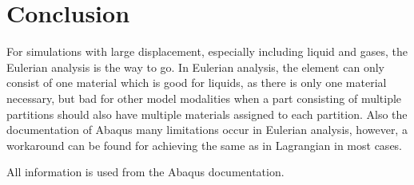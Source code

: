 \documentclass[12pt]{article}
\begin{document}
\section{Conclusion}

For simulations with large displacement, especially including liquid and gases, the Eulerian analysis is the way to go. In Eulerian analysis, the element can only consist of one material which is good for liquids, as there is only one material necessary, but bad for other model modalities when a part consisting of multiple partitions should also have multiple materials assigned to each partition. Also the documentation of Abaqus many limitations occur in Eulerian analysis, however, a workaround can be found for achieving the same as in Lagrangian in most cases.

\vspace{5mm}
\noindent All information is used from the Abaqus documentation. 
\end{document}
